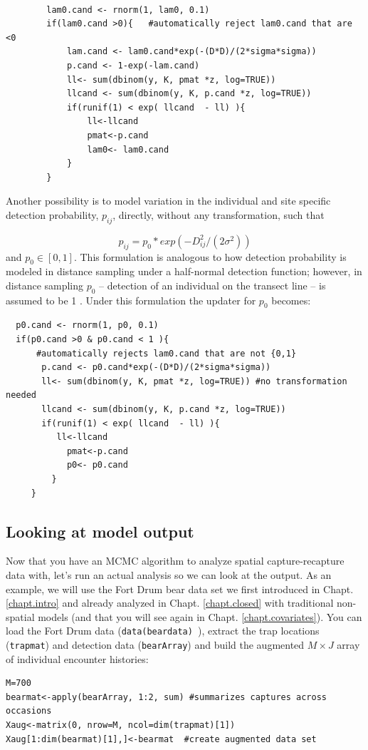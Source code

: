 \begin{verbatim}

        lam0.cand <- rnorm(1, lam0, 0.1)
        if(lam0.cand >0){   #automatically reject lam0.cand that are <0
            lam.cand <- lam0.cand*exp(-(D*D)/(2*sigma*sigma))
            p.cand <- 1-exp(-lam.cand)
            ll<- sum(dbinom(y, K, pmat *z, log=TRUE))  
            llcand <- sum(dbinom(y, K, p.cand *z, log=TRUE))
            if(runif(1) < exp( llcand  - ll) ){
                ll<-llcand
                pmat<-p.cand
                lam0<- lam0.cand
            }
        }
\end{verbatim}

Another possibility is to model variation in the individual and site 
specific detection probability,  $p_{ij}$, directly, without any 
transformation, such that

\[
p_{ij} = p_0 * exp(-D_{ij}^2/(2\sigma^2))
\]
and $p_0 \in [0,1]$.
This formulation is analogous to how detection probability is modeled 
in distance sampling under a half-normal detection function; however, 
in distance sampling $p_0$ -- detection of an individual on the transect 
line -- is assumed to be 1 \citep{buckland_etal:2001}. Under this 
formulation the updater for $p_0$ becomes:

\begin{verbatim}
  p0.cand <- rnorm(1, p0, 0.1)
  if(p0.cand >0 & p0.cand < 1 ){   
      #automatically rejects lam0.cand that are not {0,1}
       p.cand <- p0.cand*exp(-(D*D)/(2*sigma*sigma))
       ll<- sum(dbinom(y, K, pmat *z, log=TRUE)) #no transformation needed
       llcand <- sum(dbinom(y, K, p.cand *z, log=TRUE))
       if(runif(1) < exp( llcand  - ll) ){
          ll<-llcand
            pmat<-p.cand
            p0<- p0.cand
         }
     }
\end{verbatim}


\subsection{Looking at model output}
Now that you have an MCMC algorithm to analyze spatial capture-recapture 
data with, let's run an actual analysis so we can look at the output. As 
an example, we will use the Fort Drum 
bear data set we first introduced in Chapt. \ref{chapt.intro} and already analyzed in Chapt. \ref{chapt.closed} with 
traditional non-spatial models (and that you will see again in Chapt. 
\ref{chapt.covariates}). You can load the Fort Drum data
(\mbox{\tt data(beardata) }), extract the 
trap locations (\mbox{\tt trapmat}) and 
detection data (\mbox{\tt bearArray}) and build the augmented $M \times J$ array of individual 
encounter histories:
\begin{verbatim}
M=700
bearmat<-apply(bearArray, 1:2, sum) #summarizes captures across occasions
Xaug<-matrix(0, nrow=M, ncol=dim(trapmat)[1])
Xaug[1:dim(bearmat)[1],]<-bearmat  #create augmented data set
\end{verbatim}


